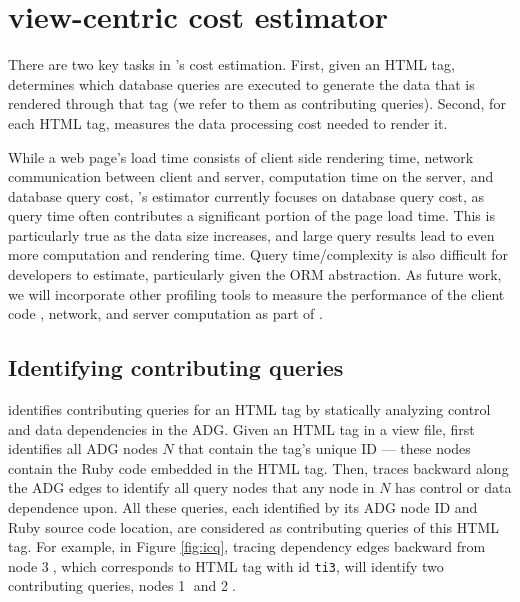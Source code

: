 \section{\Tool view-centric cost estimator} 
\label{sec:profile}

There are two key tasks in \Tool's cost estimation. First, given an HTML tag,
\Tool determines which database queries are executed
to generate the data that is rendered through that tag (we refer to them as contributing queries). 
Second, for each HTML tag, \Tool measures the data processing cost needed to render it.

While a web page's load time consists of client side rendering time,
network communication between client and server, 
computation time on the server, and database query cost,
\Tool's estimator currently focuses on database query cost, as query time often contributes a significant portion of the page load time. This is particularly true as the data size increases, and large query results lead to even more computation and rendering time. 
Query time/complexity is also
difficult for developers to estimate, particularly given the ORM abstraction.
As future work, we will incorporate other profiling tools to measure the performance of 
the client code \cite{chromeDev}, network, and server computation as part of \Tool.


\subsection{Identifying contributing queries}
\Tool identifies contributing queries for an HTML tag by statically analyzing
control and data dependencies in the ADG. Given an HTML tag in a view file, 
\Tool first identifies all ADG nodes $N$ that contain the tag's unique ID ---
these nodes contain the Ruby code embedded in the HTML tag. Then, \Tool 
 traces backward along the ADG edges to
identify all query nodes that any node in $N$ has control or data dependence upon. 
All these queries, each identified by its ADG node ID and Ruby source code
location, are considered as contributing queries of this HTML tag. 
For example, in Figure \ref{fig:icq}, tracing dependency edges backward from node 
{\large \textcircled{\small 3}}, which corresponds to HTML tag with id {\tt ti3}, %
will identify two contributing queries, nodes {\large \textcircled{\small 1}} and 
{\large \textcircled{\small 2}}.


